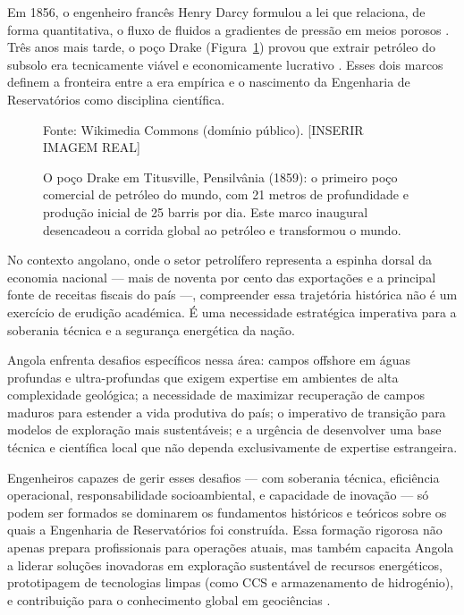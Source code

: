 \documentclass[
  12pt,
  a4paper,
  oneside,
  brazilian,
  sumario=tradicional
]{abntex2}
\renewcommand{\fonte}[1]{\vspace{2pt}\par\noindent\footnotesize Fonte: #1}
\begin{document}
Em 1856, o engenheiro francês Henry Darcy formulou a lei que relaciona,
de forma quantitativa, o fluxo de fluidos a gradientes de pressão em
meios porosos \cite{dake2014, rosa2006}. Três anos mais tarde, o poço
Drake (Figura~\ref{fig:poco_drake}) provou que extrair petróleo do
subsolo era tecnicamente viável e economicamente lucrativo
\cite{yergin1991}. Esses dois marcos definem a fronteira entre a era
empírica e o nascimento da Engenharia de Reservatórios como disciplina
científica.

\begin{figure}[H]
  \centering
  \caption{O poço Drake em Titusville, Pensilvânia (1859): o primeiro poço comercial de petróleo do mundo, com 21 metros de profundidade e produção inicial de 25 barris por dia. Este marco inaugural desencadeou a corrida global ao petróleo e transformou o mundo.}
  \label{fig:poco_drake}
  \fonte{Wikimedia Commons (domínio público). [INSERIR IMAGEM REAL]}
\end{figure}

No contexto angolano, onde o setor petrolífero representa a espinha
dorsal da economia nacional — mais de noventa por cento das exportações
e a principal fonte de receitas fiscais do país —, compreender essa
trajetória histórica não é um exercício de erudição académica. É uma
necessidade estratégica imperativa para a soberania técnica e a
segurança energética da nação.

Angola enfrenta desafios específicos nessa área: campos offshore em
águas profundas e ultra-profundas que exigem expertise em ambientes
de alta complexidade geológica; a necessidade de maximizar recuperação
de campos maduros para estender a vida produtiva do país; o imperativo
de transição para modelos de exploração mais sustentáveis; e a urgência
de desenvolver uma base técnica e científica local que não dependa
exclusivamente de expertise estrangeira.

Engenheiros capazes de gerir esses desafios — com soberania técnica,
eficiência operacional, responsabilidade socioambiental, e capacidade
de inovação — só podem ser formados se dominarem os fundamentos
históricos e teóricos sobre os quais a Engenharia de Reservatórios
foi construída. Essa formação rigorosa não apenas prepara profissionais
para operações atuais, mas também capacita Angola a liderar soluções
inovadoras em exploração sustentável de recursos energéticos, prototipagem
de tecnologias limpas (como CCS e armazenamento de hidrogénio), e
contribuição para o conhecimento global em geociências
\cite{ramos2016, ramos2020}.
\end{document}

